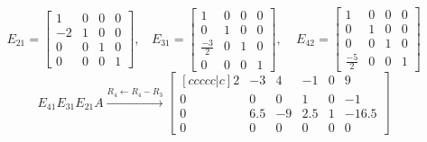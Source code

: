 \documentclass[11pt,a4paper]{article}
\begin{document}
\[
E_{21} = \begin{bmatrix}
            1 & 0 & 0 & 0\\
            -2 & 1 & 0 & 0\\
            0 & 0 & 1 & 0\\
            0 & 0 & 0 & 1
         \end{bmatrix}, ~~~~E_{31} = \begin{bmatrix}
                                    1 & 0 & 0 & 0\\
                                    0 & 1 & 0 & 0\\
                                    \frac{-3}{2} & 0 & 1 & 0\\
                                    0 & 0 & 0 & 1
                                 \end{bmatrix}, ~~~~~E_{42} = \begin{bmatrix}
                                                            1 & 0 & 0 & 0\\
                                                            0 & 1 & 0 & 0\\
                                                            0 & 0 & 1 & 0\\
                                                            \frac{-5}{2} & 0 & 0 & 1
                                                       \end{bmatrix}
\]
\[
E_{41}E_{31}E_{21}A \xrightarrow{R_4\leftarrow R_4 - R_3}\begin{bmatrix}[ccccc|c]
                                                                        2 & -3 & 4 & -1 & 0 & 9\\
                                                                        0 & 0 & 0 & 1 & 0 & -1 \\
                                                                        0 & 6.5 & -9 & 2.5 & 1 & -16.5\\
                                                                        0 & 0 & 0 & 0 & 0 & 0
                                                                   \end{bmatrix} 
\]
\end{document}
